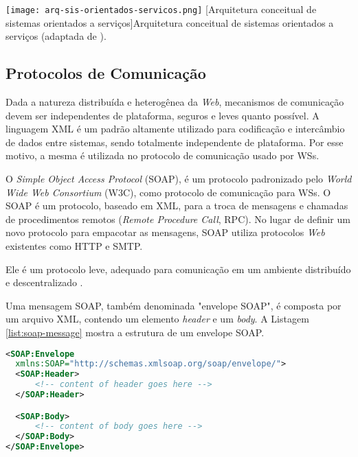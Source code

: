 \begin{center}
	\texttt{[image: arq-sis-orientados-servicos.png]}
	[Arquitetura conceitual de sistemas orientados a serviços]{Arquitetura conceitual de sistemas orientados a serviços (adaptada de \cite{sommerville2011soft}).}
	\label{fig:arq-sis-orientados-servicos}
\end{center}

\subsection{Protocolos de Comunicação}

Dada a natureza distribuída e heterogênea da \textit{Web}, mecanismos de comunicação
devem ser independentes de plataforma, seguros e leves quanto possível.
A linguagem XML é um padrão altamente utilizado para codificação e intercâmbio de dados
entre sistemas, sendo totalmente independente de plataforma. Por esse motivo,
a mesma é utilizada no protocolo de comunicação usado por WSs.

O \textit{Simple Object Access Protocol} (SOAP), é um protocolo padronizado pelo \textit{World Wide Web Consortium} (W3C),
como protocolo de comunicação para WSs. O SOAP é um protocolo, baseado em XML, para a troca
de mensagens e chamadas de procedimentos remotos (\textit{Remote Procedure Call}, 
RPC). 
No lugar de definir um novo protocolo para empacotar as mensagens, SOAP utiliza protocolos \textit{Web} existentes como HTTP e SMTP.

Ele é um protocolo leve, adequado para comunicação em um ambiente distribuído e descentralizado \cite{vilas2007providing}.

Uma mensagem SOAP, também denominada "envelope SOAP", é composta por um arquivo XML, contendo um elemento \textit{header} e um \textit{body}.
A Listagem \ref{list:soap-message} mostra a estrutura de um envelope SOAP.

\begin{lstlisting}[language=xml]
<SOAP:Envelope 
  xmlns:SOAP="http://schemas.xmlsoap.org/soap/envelope/">
  <SOAP:Header>
      <!-- content of header goes here -->
  </SOAP:Header>

  <SOAP:Body>
      <!-- content of body goes here -->
  </SOAP:Body>
</SOAP:Envelope>
\end{lstlisting}

